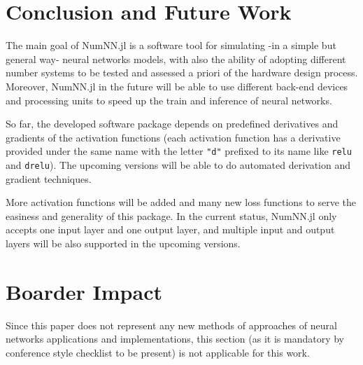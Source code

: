 \section{Conclusion and Future Work}

The main goal of NumNN.jl is a software tool for simulating -in a simple but general way- neural networks models, with also the ability of adopting different number systems to be tested and assessed a priori of the hardware design process. Moreover, NumNN.jl in the future will be able to use different back-end devices and processing units to speed up the train and inference of neural networks. 

So far, the developed software package depends on predefined derivatives and gradients of the activation functions (each activation function has a derivative provided under the same name with the letter \texttt{"d"} prefixed to its name like \texttt{relu} and \texttt{drelu}). The upcoming versions will be able to do automated derivation and gradient techniques.

More activation functions will be added and many new loss functions to serve the easiness and generality of this package. In the current status, NumNN.jl only accepts one input layer and one output layer, and multiple input and output layers will be also supported in the upcoming versions.


\section*{Boarder Impact}

Since this paper does not represent any new methods of approaches of neural networks applications and implementations, this section (as it is mandatory by conference style checklist to be present) is not applicable for this work.